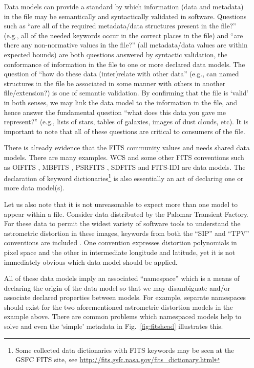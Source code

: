 \documentclass[final,authoryear,5p,times,twocolumn]{elsarticle}
\begin{document}
{{Data models can provide a standard by which information (data and metadata)
in the file may be semantically and syntactically validated in software.
Questions such as ``are all of the required metadata/data structures present
in the file?'' (e.g., all of
the needed keywords occur in the correct places in the file) and ``are
there any non-normative values in the file?'' (all metadata/data values
are within expected bounds) are both questions answered by syntactic
validation, the conformance of information in the file to one or more
declared data models.  The question of ``how do these data (inter)relate
with other data'' (e.g., can named structures in the file be associated
in some manner with others in another file/extension?) is one of semantic
validation. By confirming that the file is `valid' in both senses, we may
link the data model to the information in the file, and hence answer the
fundamental question ``what does this data you gave me represent?'' (e.g., lists
of stars, tables of galaxies, images of dust clouds, etc).
It is important to note that all of these questions are critical to
consumers of the file.


There is already evidence that the FITS community values and needs shared
data models. There are many examples. WCS and some other FITS conventions
such as OIFITS
\citep{2006SPIE.6268E.106T}, MBFITS \citep{2006A&A...454L..25M},
PSRFITS \citep{2004PASA...21..302H},
SDFITS \citep{2000ASPC..216..243G} and FITS-IDI \citep{2011AIPS114}
are data models. The declaration of keyword
dictionaries\footnote{Some collected data dictionaries with FITS
keywords may be seen at the GSFC FITS site, see
\url{http://fits.gsfc.nasa.gov/fits\_dictionary.html}} is also essentially
an act of declaring one or more data model(s).

Let us also note that it is not unreasonable to expect more than one model
to appear within a file. Consider data distributed by the Palomar Transient
Factory.  For these data to permit the widest
variety of software tools to understand the astrometric distortion in these
images, keywords from both the ``SIP'' and ``TPV'' conventions are included
\citep{2012SPIE.8451E..1MS}.
One convention expresses distortion polynomials in pixel space and the
other in intermediate longitude and latitude, yet it is not immediately
obvious which data model should be applied.


All of these data models imply an associated ``namespace'' which is
a means of declaring the origin of the data model so that we may
disambiguate and/or associate declared properties between models.
For example, separate namespaces should exist for the two aforementioned
astrometric distortion models in the example above.
There are common problems which name\-spaced models help to solve and even
the `simple' metadata in Fig.~\ref{fig:fitshead} illustrates this.


}}
\end{document}
